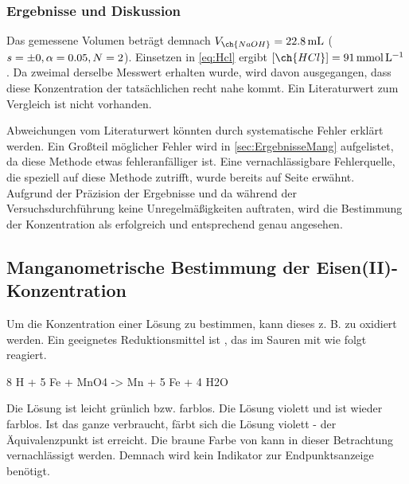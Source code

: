 \documentclass{article}
\begin{document}
      \subsubsection{Ergebnisse und Diskussion} \label{sec:ErgebnisseHCLzz}
        
        Das gemessene Volumen beträgt demnach $V_{\ch{NaOH}} = \SI[mode=text]{22.8}{\milli\liter}$ ($s = \num{\pm 0}, \alpha=0.05,N=2$). Einsetzen in \eqref{eq:Hcl} ergibt $[\ch{HCl}] = \SI[mode=text]{91}{\milli\mole\per\liter}$. Da zweimal derselbe Messwert erhalten wurde, wird davon ausgegangen, dass diese Konzentration der tatsächlichen recht nahe kommt. Ein Literaturwert zum Vergleich ist nicht vorhanden. 
        
        Abweichungen vom Literaturwert könnten durch systematische Fehler erklärt werden. Ein Großteil möglicher Fehler wird in \ref{sec:ErgebnisseMang} aufgelistet, da diese Methode etwas fehleranfälliger ist. Eine vernachlässigbare Fehlerquelle, die speziell auf diese Methode zutrifft, wurde bereits auf Seite \pageref{seite} erwähnt. \\
        
        Aufgrund der Präzision der Ergebnisse und da während der Versuchsdurchführung keine Unregelmäßigkeiten auftraten, wird die Bestimmung der  Konzentration als erfolgreich und entsprechend genau angesehen. 
        
    \pagebreak
    
    \subsection{Manganometrische Bestimmung der Eisen(II)-Konzentration}
        
        Um die Konzentration einer  Lösung zu bestimmen, kann dieses z. B. zu  oxidiert werden. Ein geeignetes Reduktionsmittel ist , das im Sauren mit  wie folgt reagiert.
        
        \begin{reaction}
          8 H\pch{}\aq{} + 5 Fe\pch[2]\aq{} + MnO4\mch\aq{} -> Mn\pch[2]\aq{} + 5 Fe\pch[3]\aq{} + 4 H2O       
        \end{reaction}
        
        Die  Lösung ist leicht grünlich bzw. farblos. Die  Lösung violett und  ist wieder farblos. Ist das ganze  verbraucht, färbt sich die Lösung violett - der Äquivalenzpunkt ist erreicht. Die braune Farbe von  kann in dieser Betrachtung vernachlässigt werden. Demnach wird kein Indikator zur Endpunktsanzeige benötigt. 
        
\end{document}
